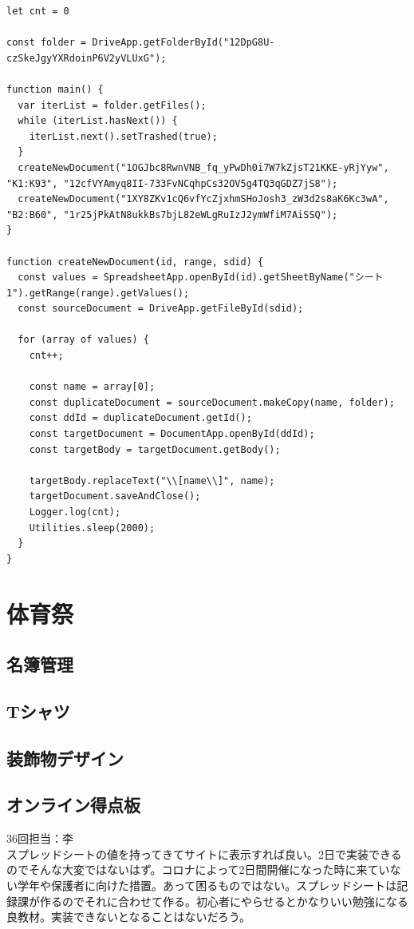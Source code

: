 \documentclass[dvipdfmx,jb5]{jarticle}
\begin{document}
\begin{lstlisting}
let cnt = 0

const folder = DriveApp.getFolderById("12DpG8U-czSkeJgyYXRdoinP6V2yVLUxG");

function main() {
  var iterList = folder.getFiles();
  while (iterList.hasNext()) {
    iterList.next().setTrashed(true);
  }
  createNewDocument("1OGJbc8RwnVNB_fq_yPwDh0i7W7kZjsT21KKE-yRjYyw", "K1:K93", "12cfVYAmyq8II-733FvNCqhpCs32OV5g4TQ3qGDZ7jS8");
  createNewDocument("1XY8ZKv1cQ6vfYcZjxhmSHoJosh3_zW3d2s8aK6Kc3wA", "B2:B60", "1r25jPkAtN8ukkBs7bjL82eWLgRuIzJ2ymWfiM7AiSSQ");
}

function createNewDocument(id, range, sdid) {
  const values = SpreadsheetApp.openById(id).getSheetByName("シート1").getRange(range).getValues();
  const sourceDocument = DriveApp.getFileById(sdid);

  for (array of values) {
    cnt++;

    const name = array[0];
    const duplicateDocument = sourceDocument.makeCopy(name, folder);
    const ddId = duplicateDocument.getId();
    const targetDocument = DocumentApp.openById(ddId);
    const targetBody = targetDocument.getBody();

    targetBody.replaceText("\\[name\\]", name);
    targetDocument.saveAndClose();
    Logger.log(cnt);
    Utilities.sleep(2000);
  }
}
\end{lstlisting}

\section{体育祭}
\subsection{名簿管理}
\subsection{Tシャツ}
\subsection{装飾物デザイン}
\subsection{オンライン得点板}
36回担当：李\\

スプレッドシートの値を持ってきてサイトに表示すれば良い。2日で実装できるのでそんな大変ではないはず。コロナによって2日間開催になった時に来ていない学年や保護者に向けた措置。あって困るものではない。スプレッドシートは記録課が作るのでそれに合わせて作る。初心者にやらせるとかなりいい勉強になる良教材。実装できないとなることはないだろう。
\end{document}
